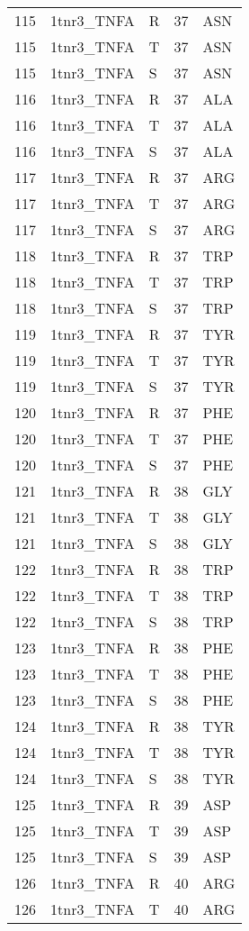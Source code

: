 \begin{longtable}[l]{l|l|l|l|l}
	115 & 1tnr3_TNFA & R & 37 & ASN \\
	115 & 1tnr3_TNFA & T & 37 & ASN \\
	115 & 1tnr3_TNFA & S & 37 & ASN \\
	116 & 1tnr3_TNFA & R & 37 & ALA \\
	116 & 1tnr3_TNFA & T & 37 & ALA \\
	116 & 1tnr3_TNFA & S & 37 & ALA \\
	117 & 1tnr3_TNFA & R & 37 & ARG \\
	117 & 1tnr3_TNFA & T & 37 & ARG \\
	117 & 1tnr3_TNFA & S & 37 & ARG \\
	118 & 1tnr3_TNFA & R & 37 & TRP \\
	118 & 1tnr3_TNFA & T & 37 & TRP \\
	118 & 1tnr3_TNFA & S & 37 & TRP \\
	119 & 1tnr3_TNFA & R & 37 & TYR \\
	119 & 1tnr3_TNFA & T & 37 & TYR \\
	119 & 1tnr3_TNFA & S & 37 & TYR \\
	120 & 1tnr3_TNFA & R & 37 & PHE \\
	120 & 1tnr3_TNFA & T & 37 & PHE \\
	120 & 1tnr3_TNFA & S & 37 & PHE \\
	121 & 1tnr3_TNFA & R & 38 & GLY \\
	121 & 1tnr3_TNFA & T & 38 & GLY \\
	121 & 1tnr3_TNFA & S & 38 & GLY \\
	122 & 1tnr3_TNFA & R & 38 & TRP \\
	122 & 1tnr3_TNFA & T & 38 & TRP \\
	122 & 1tnr3_TNFA & S & 38 & TRP \\
	123 & 1tnr3_TNFA & R & 38 & PHE \\
	123 & 1tnr3_TNFA & T & 38 & PHE \\
	123 & 1tnr3_TNFA & S & 38 & PHE \\
	124 & 1tnr3_TNFA & R & 38 & TYR \\
	124 & 1tnr3_TNFA & T & 38 & TYR \\
	124 & 1tnr3_TNFA & S & 38 & TYR \\
	125 & 1tnr3_TNFA & R & 39 & ASP \\
	125 & 1tnr3_TNFA & T & 39 & ASP \\
	125 & 1tnr3_TNFA & S & 39 & ASP \\
	126 & 1tnr3_TNFA & R & 40 & ARG \\
	126 & 1tnr3_TNFA & T & 40 & ARG \\

\end{longtable}
